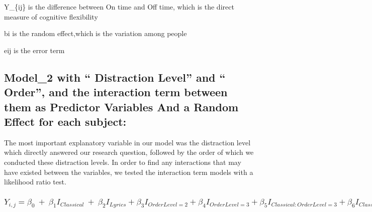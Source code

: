 \documentclass[]{article}
\begin{document}
Y\_\{ij\} is the difference between On time and Off time, which is the
direct measure of cognitive flexibility

bi is the random effect,which is the variation among people

eij is the error term

\hypertarget{model_2-with-distraction-level-and-order-and-the-interaction-term-between-them-as-predictor-variables-and-a-random-effect-for-each-subject}{%
\subsection{Model\_2 with `` Distraction Level'' and `` Order'', and the
interaction term between them as Predictor Variables And a Random Effect
for each
subject:}\label{model_2-with-distraction-level-and-order-and-the-interaction-term-between-them-as-predictor-variables-and-a-random-effect-for-each-subject}}

The most important explanatory variable in our model was the distraction
level which directly answered our research question, followed by the
order of which we conducted these distraction levels. In order to find
any interactions that may have existed between the variables, we tested
the interaction term models with a likelihood ratio test.

\hypertarget{y_ijbeta_0beta_1i_classicalbeta_2i_lyricsbeta_3i_orderlevel2beta_4i_orderlevel3-beta_5i_classicalorderlevel3beta_6i_classicalorderlevel2beta_7i_lyricsorderlevel3beta_8i_lyricsorderlevel2b_ie_ij}{%
\subsubsection{\texorpdfstring{\(Y_{i,j}=\beta_{0}~+~\beta_1I_{Classical}~+~\beta_2I_{Lyrics}+\beta_3I_{OrderLevel=2}+\beta_4I_{OrderLevel=3}+ \beta_5I_{Classical:OrderLevel=3}+\beta_6I_{Classical:OrderLevel=2}+\beta_7I_{lyrics:OrderLevel=3}+\beta_8I_{lyrics:OrderLevel=2}+b_i+e_{ij}\)}{Y\_\{i,j\}=\textbackslash beta\_\{0\}\textasciitilde+\textasciitilde\textbackslash beta\_1I\_\{Classical\}\textasciitilde+\textasciitilde\textbackslash beta\_2I\_\{Lyrics\}+\textbackslash beta\_3I\_\{OrderLevel=2\}+\textbackslash beta\_4I\_\{OrderLevel=3\}+ \textbackslash beta\_5I\_\{Classical:OrderLevel=3\}+\textbackslash beta\_6I\_\{Classical:OrderLevel=2\}+\textbackslash beta\_7I\_\{lyrics:OrderLevel=3\}+\textbackslash beta\_8I\_\{lyrics:OrderLevel=2\}+b\_i+e\_\{ij\}}}\label{y_ijbeta_0beta_1i_classicalbeta_2i_lyricsbeta_3i_orderlevel2beta_4i_orderlevel3-beta_5i_classicalorderlevel3beta_6i_classicalorderlevel2beta_7i_lyricsorderlevel3beta_8i_lyricsorderlevel2b_ie_ij}}
\end{document}
